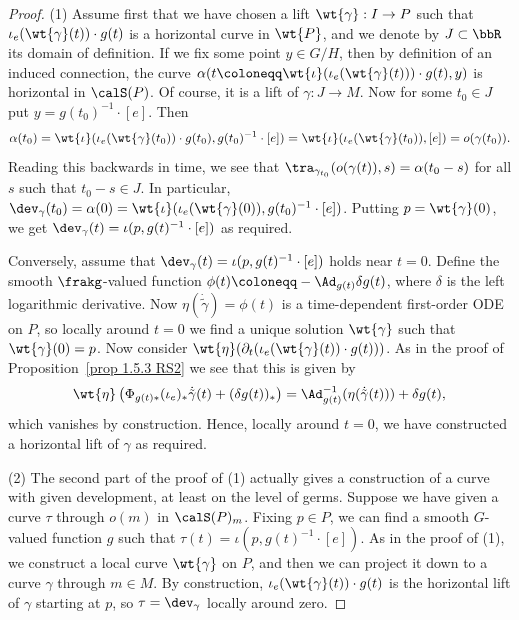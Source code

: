 \begin{proof}
    (1) Assume first that we have chosen a lift $\wt{\gamma}:I\to P$ such that $\iota_e(\wt{\gamma}(t))\cdot g(t)$ is a horizontal curve in $\wt{P}$, and we denote by $J\subset \bbR$ its domain of definition. If we fix some point $y\in G\slash H$, then by definition of an induced connection, the curve $\alpha(t\coloneqq \wt{\iota}(\iota_e(\wt{\gamma}(t)))\cdot g(t),y)$ is horizontal in $\calS(P)$. Of course, it is a lift of $\gamma:J\to M$. Now for some $t_0\in J$ put $y=g(t_0)^{-1}\cdot [e]$. Then 
    \[\alpha(t_0)=\wt{\iota}(\iota_e(\wt{\gamma}(t_0))\cdot g(t_0),g(t_0)^{-1}\cdot [e])=\wt{\iota}(\iota_e(\wt{\gamma}(t_0)),[e])=o(\gamma(t_0)).\]
    Reading this backwards in time, we see that $\tra_{\gamma_{t_0}}(o(\gamma(t)),s)=\alpha(t_0-s)$ for all $s$ such that $t_0-s\in J$. In particular, $\dev_\gamma(t_0)=\alpha(0)=\wt{\iota}(\iota_e(\wt{\gamma}(0)),g(t_0)^{-1}\cdot [e])$. Putting $p=\wt{\gamma}(0)$, we get $\dev_\gamma(t)=\iota(p,g(t)^{-1}\cdot [e])$ as required.

    Conversely, assume that $\dev_\gamma(t)=\iota(p,g(t)^{-1}\cdot [e])$ holds near $t=0$. Define the smooth $\frakg$-valued function $\phi(t)\coloneqq -\Ad_{g(t)}\delta g(t)$, where $\delta$ is the left logarithmic derivative. Now $\eta(\dot{\tilde{\gamma}})=\phi(t)$ is a time-dependent first-order ODE on $P$, so locally around $t=0$ we find a unique solution $\wt{\gamma}$ such that $\wt{\gamma}(0)=p$. Now consider $\wt{\eta}(\partial_t(\iota_e(\wt{\gamma}(t))\cdot g(t)))$. As in the proof of Proposition~\ref{prop 1.5.3 RS2} we see that this is given by 
    \[\wt{\eta}\left(\Phi_{g(t)\ast }(\iota_e)_\ast \dot{\tilde{\gamma}}(t)+(\delta g(t))_\ast\right)=\Ad_{g(t)}^{-1}(\eta(\dot{\tilde{\gamma}}(t)))+\delta g(t),\]
    which vanishes by construction. Hence, locally around $t=0$, we have constructed a horizontal lift of $\gamma$ as required.

    (2) The second part of the proof of (1) actually gives a construction of a curve with given development, at least on the level of germs. Suppose we have given a curve $\tau$ through $o(m)$ in $\calS(P)_m$. Fixing $p\in P$, we can find a smooth $G$-valued function $g$ such that $\tau(t)=\iota(p,g(t)^{-1}\cdot [e])$. As in the proof of (1), we construct a local curve $\wt{\gamma}$ on $P$, and then we can project it down to a curve $\gamma$ through $m\in M$. By construction, $\iota_e(\wt{\gamma}(t))\cdot g(t)$ is the horizontal lift of $\gamma$ starting at $p$, so $\tau=\dev_\gamma$ locally around zero.


\end{proof}
